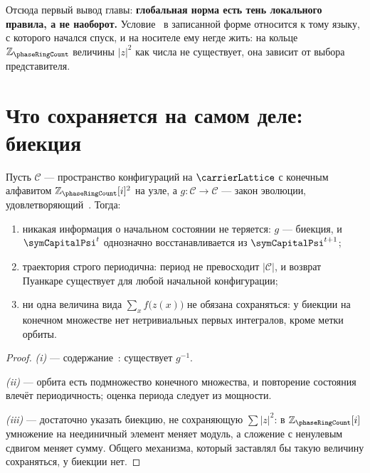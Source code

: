 Отсюда первый вывод главы: \textbf{глобальная норма есть тень локального правила,
а не наоборот.} Условие~ в записанной форме относится к тому языку,
с которого начался спуск, и на носителе ему негде жить: на кольце
$\mathbb{Z}_{\phaseRingCount}$ величины $|z|^2$ как числа не существует,
она зависит от выбора представителя.

\section{Что сохраняется на самом деле: биекция}

\begin{theorem}
\label{thm:info-bijection}
Пусть $\mathcal{C}$ --- пространство конфигураций на $\carrierLattice$
с конечным алфавитом $\mathbb{Z}_{\phaseRingCount}[i]^2$ на узле,
а $g:\mathcal{C}\to\mathcal{C}$ --- закон эволюции, удовлетворяющий~.
Тогда:
\begin{enumerate}[label=(\roman*)]
\item никакая информация о начальном состоянии не теряется: $g$ --- биекция,
      и $\symCapitalPsi^{t}$ однозначно восстанавливается из $\symCapitalPsi^{t+1}$;
\item траектория строго периодична: период не превосходит $|\mathcal{C}|$,
      и возврат Пуанкаре существует для любой начальной конфигурации;
\item ни одна величина вида $\sum_x f\bigl(z(x)\bigr)$ не обязана сохраняться:
      у биекции на конечном множестве нет нетривиальных первых интегралов,
      кроме метки орбиты.
\end{enumerate}
\end{theorem}

\begin{proof}
\emph{(i)} --- содержание~: существует $g^{-1}$.

\emph{(ii)} --- 
орбита есть подмножество конечного множества, и повторение состояния
влечёт периодичность; оценка периода следует из мощности.

\emph{(iii)} --- 
достаточно указать биекцию, не сохраняющую $\sum|z|^2$: в $\mathbb{Z}_{\phaseRingCount}[i]$
умножение на неединичный элемент меняет модуль, а сложение с ненулевым сдвигом
меняет сумму. Общего механизма, который заставлял бы такую величину сохраняться,
у биекции нет.
\end{proof}

